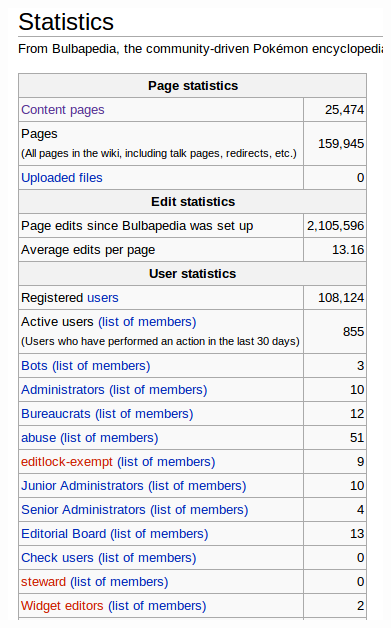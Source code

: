 \documentclass{beamer}
\begin{document}
\begin{frame}
\begin{columns}
\begin{column}{0.5\textwidth}
      \includegraphics[height = 0.8\textheight, width = \textwidth, keepaspectratio = true]{figure/bulb_stats}
    \end{column}
  \end{columns}
\end{frame}
\end{document}
